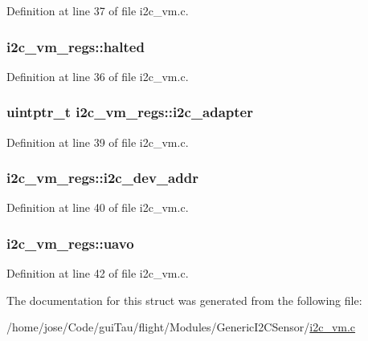 Definition at line 37 of file i2c\-\_\-vm.\-c.

\hypertarget{structi2c__vm__regs_aa3c803fa05ab57a838ae6b617d34482e}{
\subsubsection[{halted}]{ i2c\-\_\-vm\-\_\-regs\-::halted}}\label{structi2c__vm__regs_aa3c803fa05ab57a838ae6b617d34482e}


Definition at line 36 of file i2c\-\_\-vm.\-c.

\hypertarget{structi2c__vm__regs_a70b3400858879a31d7a1a032f6b2807e}{
\subsubsection[{i2c\-\_\-adapter}]{\setlength{\rightskip}{0pt plus 5cm}uintptr\-\_\-t i2c\-\_\-vm\-\_\-regs\-::i2c\-\_\-adapter}}\label{structi2c__vm__regs_a70b3400858879a31d7a1a032f6b2807e}


Definition at line 39 of file i2c\-\_\-vm.\-c.

\hypertarget{structi2c__vm__regs_a3f919c5ae80615db316bec29bd0d1156}{
\subsubsection[{i2c\-\_\-dev\-\_\-addr}]{ i2c\-\_\-vm\-\_\-regs\-::i2c\-\_\-dev\-\_\-addr}}\label{structi2c__vm__regs_a3f919c5ae80615db316bec29bd0d1156}


Definition at line 40 of file i2c\-\_\-vm.\-c.

\hypertarget{structi2c__vm__regs_a7c478bf7f2b9d2dc1501e92e1368b69e}{
\subsubsection[{uavo}]{ i2c\-\_\-vm\-\_\-regs\-::uavo}}\label{structi2c__vm__regs_a7c478bf7f2b9d2dc1501e92e1368b69e}


Definition at line 42 of file i2c\-\_\-vm.\-c.



The documentation for this struct was generated from the following file\-:\begin{DoxyCompactItemize}
\item 
/home/jose/\-Code/gui\-Tau/flight/\-Modules/\-Generic\-I2\-C\-Sensor/\hyperlink{i2c__vm_8c}{i2c\-\_\-vm.\-c}\end{DoxyCompactItemize}

